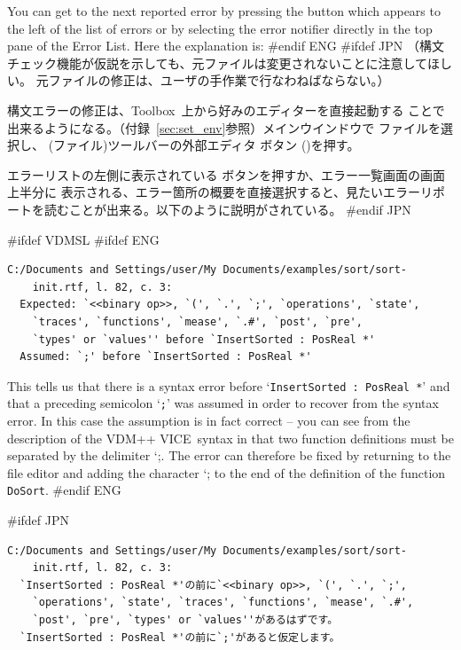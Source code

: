 \documentclass[\pformat,12pt]{article}
\newcommand{\vdmslpp}{VDM-SL}
\newcommand{\Toolbox}{Toolbox}
\newcommand{\vdmslpp}{VDM++}
\newcommand{\Toolbox}{Toolbox}
\renewcommand{\vdmslpp}{VDM++ VICE}
\newcommand{\Lit}[1]{`#1\Quote}
\newcommand{\aaa}{\tt }
\newcommand{\guicmd}[1]{{\sf #1}}
\newcommand{\guicmd}[1]{{\gt #1}}
\begin{document}
You can get to the next reported error by pressing the {\fbox{\tt >}}
button which appears to the left of the list of errors or by selecting the
error notifier directly in the top pane of the \guicmd{Error
  List}. Here the explanation is: 
#endif ENG
#ifdef JPN
（構文チェック機能が仮説を示しても、元ファイルは変更されないことに注意してほしい。
元ファイルの修正は、ユーザの手作業で行なわねばならない。）

構文エラーの修正は、\Toolbox\ 上から好みのエディターを直接起動する
ことで出来るようになる。（付録~\ref{sec:set_env}参照）メインウインドウで
ファイルを選択し、
(\guicmd{ファイル})ツールバーの\guicmd{外部エディタ} ボタン
()を押す。

エラーリストの左側に表示されている {\fbox{\tt >}}ボタンを押すか、\guicmd{エラー一覧}画面の画面上半分に
表示される、エラー箇所の概要を直接選択すると、見たいエラーリポートを読むことが出来る。以下のように説明がされている。
#endif JPN

#ifdef VDMSL
#ifdef ENG
\begin{verbatim}
C:/Documents and Settings/user/My Documents/examples/sort/sort-
    init.rtf, l. 82, c. 3:
  Expected: `<<binary op>>, `(', `.', `;', `operations', `state',
    `traces', `functions', `mease', `.#', `post', `pre',
    `types' or `values'' before `InsertSorted : PosReal *'
  Assumed: `;' before `InsertSorted : PosReal *'
\end{verbatim}

This tells us that there is a syntax error before `{\tt InsertSorted :
  PosReal *}' and that a preceding semicolon `{\tt ;}' was assumed in
  order to recover from the syntax error. In this case the assumption
  is in fact correct -- you can see from the  description of the
\vdmslpp\ syntax in \cite{UMLMan-SCSK} that two function definitions must
  be separated by the delimiter \Lit{;}. The error can therefore be
  fixed by returning to the file editor and adding the character
  \Lit{;} to the end of the definition of the function {\aaa DoSort}.
#endif ENG

#ifdef JPN
\begin{verbatim}
C:/Documents and Settings/user/My Documents/examples/sort/sort-
    init.rtf, l. 82, c. 3:
  `InsertSorted : PosReal *'の前に`<<binary op>>, `(', `.', `;',
    `operations', `state', `traces', `functions', `mease', `.#',
    `post', `pre', `types' or `values''があるはずです。
  `InsertSorted : PosReal *'の前に`;'があると仮定します。
\end{verbatim}
\end{document}

